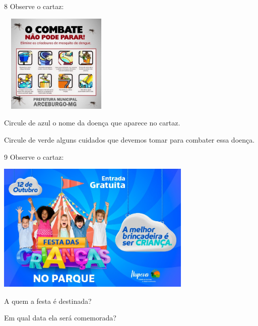 \num{8} Observe o cartaz:

\includegraphics[width=2.15306in,height=1.86730in]{media/image134.jpeg}


\begin{escolha}
\item Circule de azul o nome da doença que aparece no cartaz.

\item Circule de verde alguns cuidados que devemos tomar para combater essa doença.
\end{escolha}

\num{9} Observe o cartaz:

\includegraphics[width=3.66026in,height=2.43572in]{media/image135.jpeg}


\begin{escolha}
\item A quem a festa é destinada?


\item Em qual data ela será comemorada?

\end{escolha}

